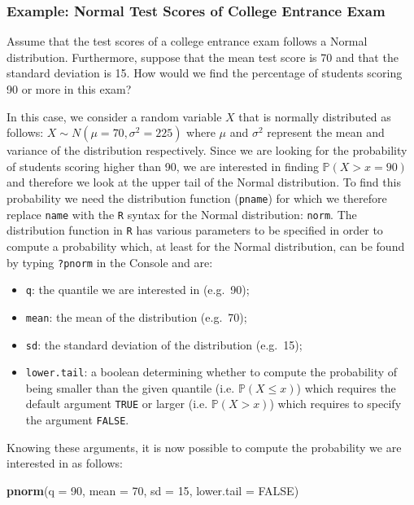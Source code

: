 \documentclass[12pt,]{krantz}
\newenvironment{Shaded}{\begin{snugshade}}{\end{snugshade}}
\newcommand{\KeywordTok}[1]{\textcolor[rgb]{0.27,0.27,0.27}{\textbf{#1}}}
\newcommand{\DataTypeTok}[1]{\textcolor[rgb]{0.27,0.27,0.27}{#1}}
\newcommand{\DecValTok}[1]{\textcolor[rgb]{0.06,0.06,0.06}{#1}}
\newcommand{\OtherTok}[1]{\textcolor[rgb]{0.37,0.37,0.37}{#1}}
\newcommand{\NormalTok}[1]{#1}
\providecommand{\tightlist}{%
  \setlength{\itemsep}{0pt}\setlength{\parskip}{0pt}}
\begin{document}
\subsubsection{Example: Normal Test Scores of College Entrance
Exam}\label{example-normal-test-scores-of-college-entrance-exam}

Assume that the test scores of a college entrance exam follows a Normal
distribution. Furthermore, suppose that the mean test score is 70 and
that the standard deviation is 15. How would we find the percentage of
students scoring 90 or more in this exam?

In this case, we consider a random variable \(X\) that is normally
distributed as follows: \(X \sim N(\mu=70, \sigma^2=225)\) where \(\mu\)
and \(\sigma^2\) represent the mean and variance of the distribution
respectively. Since we are looking for the probability of students
scoring higher than 90, we are interested in finding
\(\mathbb{P}(X > x=90)\) and therefore we look at the upper tail of the
Normal distribution. To find this probability we need the distribution
function (\texttt{pname}) for which we therefore replace \texttt{name}
with the \texttt{R} syntax for the Normal distribution: \texttt{norm}.
The distribution function in \texttt{R} has various parameters to be
specified in order to compute a probability which, at least for the
Normal distribution, can be found by typing \texttt{?pnorm} in the
Console and are:

\begin{itemize}
\tightlist
\item
  \texttt{q}: the quantile we are interested in (e.g.~90);
\item
  \texttt{mean}: the mean of the distribution (e.g.~70);
\item
  \texttt{sd}: the standard deviation of the distribution (e.g.~15);
\item
  \texttt{lower.tail}: a boolean determining whether to compute the
  probability of being smaller than the given quantile (i.e.
  \(\mathbb{P}(X \leq x)\)) which requires the default argument
  \texttt{TRUE} or larger (i.e. \(\mathbb{P}(X > x)\)) which requires to
  specify the argument \texttt{FALSE}.
\end{itemize}

Knowing these arguments, it is now possible to compute the probability
we are interested in as follows:

\begin{Shaded}
\begin{Highlighting}[]
\KeywordTok{pnorm}\NormalTok{(}\DataTypeTok{q =} \DecValTok{90}\NormalTok{, }\DataTypeTok{mean =} \DecValTok{70}\NormalTok{, }\DataTypeTok{sd =} \DecValTok{15}\NormalTok{, }\DataTypeTok{lower.tail =} \OtherTok{FALSE}\NormalTok{) }
\end{Highlighting}
\end{Shaded}
\end{document}
